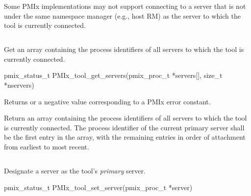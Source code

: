 \adviceuserstart
Some \ac{PMIx} implementations may not support connecting to a server that is not under the same namespace manager (e.g., host \ac{RM}) as the server to which the tool is currently connected.
\adviceuserend


\subsection{}

\summary

Get an array containing the  process identifiers of all servers to which the tool is currently connected.

\format

\cspecificstart
\begin{codepar}
pmix_status_t
PMIx_tool_get_servers(pmix_proc_t *servers[], size_t *nservers)
\end{codepar}
\cspecificend

\begin{arglist}
\end{arglist}

Returns  or a negative value corresponding to a PMIx error constant.

\descr

Return an array containing the  process identifiers of all servers to which the tool is currently connected. The process identifier of the current primary server shall be the first entry in the array, with the remaining entries in order of attachment from earliest to most recent.


\subsection{}

\summary

Designate a server as the tool's \emph{primary} server.

\format

\cspecificstart
\begin{codepar}
pmix_status_t
PMIx_tool_set_server(pmix_proc_t *server)
\end{codepar}
\cspecificend

